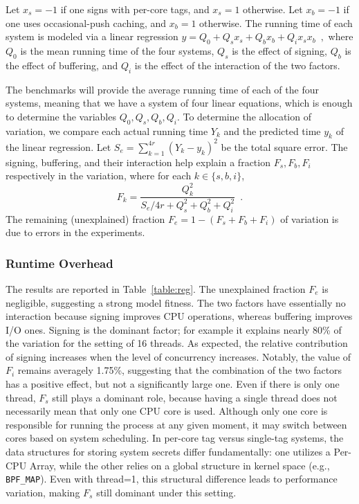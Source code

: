 \documentclass[sigconf]{sty/acmart}
\newcommand{\Xs}{x_s}
\newcommand{\Xc}{x_b}
\newcommand{\Qs}{Q_s}
\newcommand{\Qc}{Q_b}
\newcommand{\Qi}{Q_i}
\newcommand{\Se}{S_e}
\newcommand{\Fs}{F_s}
\newcommand{\Fc}{F_b}
\newcommand{\Fi}{F_i}
\newcommand{\Fx}{F_k}
\newcommand{\Qx}{Q_k}
\begin{document}
Let $\Xs = -1$ if one signs with per-core tags, and $\Xs = 1$ otherwise. 
Let $\Xc = -1$ if one uses occasional-push caching, and $\Xc = 1$ otherwise. 
The running time of each system is modeled via a linear regression 
\( y = Q_0 + \Qs \Xs + \Qc \Xc + \Qi \Xs \Xc \enspace, \)
where $Q_0$ is the mean running time of the four systems,
$\Qs$ is the effect of signing, $\Qc$ is the effect of buffering, 
and $\Qi$ is the effect of the interaction of the two factors. 

The benchmarks will provide the average running time of each of the four systems, 
meaning that we have a system of four linear equations, 
 which is enough to determine the variables $Q_0, \Qs, \Qc, \Qi$. 
To determine the allocation of variation, 
we compare each actual running time $Y_k$ 
and the predicted time $y_k$ of the linear regression. 
Let 
\(
     \Se  = \sum_{k = 1}^{4r} (Y_k - y_k)^2
\)
be the total square error. 
The signing, buffering, and their interaction help explain a fraction $\Fs, \Fc, \Fi$ respectively in the variation, 
where for each $k \in \{s, b, i\}$, 
\[ \Fx = \frac{\Qx^2}{\Se/4r + \Qs^2 + \Qc^2 + \Qi^2} \enspace. 
\] 
The remaining (unexplained) fraction $F_e = 1 - (\Fs + \Fc + \Fi)$ of variation is due to  errors in the experiments. 


\subsubsection{Runtime Overhead}

The results are reported in Table~\ref{table:reg}.
The unexplained fraction $F_e$ is negligible, suggesting a strong model fitness.
The two factors have essentially no interaction because signing improves CPU operations,
whereas buffering improves I/O ones.
Signing is the dominant factor; for example it explains nearly 80\% of the variation
for the setting of 16 threads.
As expected, the relative contribution of signing increases when the level of concurrency increases.
Notably, the value of \( F_i \) remains averagely 1.75\%, suggesting that the combination of the two factors has a positive effect, but not a significantly large one. 
Even if there is only one thread, \( F_s \) still plays a dominant role, because having a single thread does not necessarily mean that only one CPU core is used. 
Although only one core is responsible for running the process at any given moment, it may switch between cores based on system scheduling. In per-core tag versus single-tag systems, the data structures for storing system secrets differ fundamentally: one utilizes a Per-CPU Array, while the other relies on a global structure in kernel space (e.g., \texttt{BPF\_MAP}). Even with thread=1, this structural difference leads to performance variation, making \( F_s \) still dominant under this setting.
\end{document}
